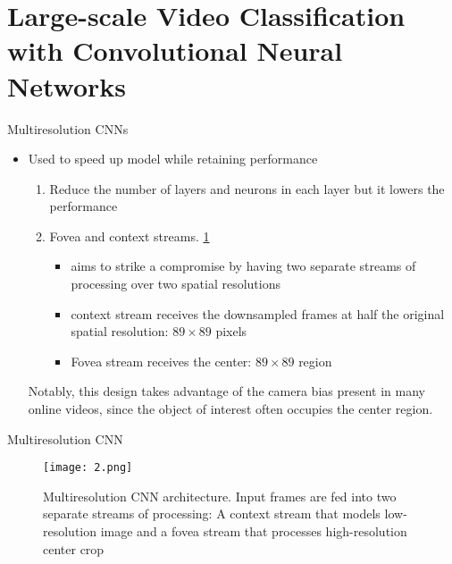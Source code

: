 \documentclass[pdf]{beamer}
\begin{document}
    \section{Large-scale Video Classification with Convolutional Neural Networks
}
    \begin{frame}{Multiresolution CNNs \cite{lsvc}} 
    \begin{itemize}
        \item Used to speed up model while retaining performance 
            
        \begin{enumerate}
            \item Reduce the number of layers and neurons in each layer but it lowers the performance
            \item Fovea and context streams. \ref{fig:multiresolution_cnn}
            \begin{itemize}
                \item aims to strike a compromise by having two
separate streams of processing over two spatial resolutions
                \item context stream receives the downsampled frames at half the original spatial resolution: $89 \times 89$ pixels
                
                \item Fovea stream receives the center: $89 \times 89 $ region
            \end{itemize}
        \end{enumerate}
        Notably, this design takes
advantage of the camera bias present in many online videos,
since the object of interest often occupies the center region.
    \end{itemize}
    \end{frame}
    
    
       \begin{frame}{Multiresolution CNN}
        \begin{figure}
            \centering
            \label{fig:multiresolution_cnn}
            \texttt{[image: 2.png]}
            \caption{ Multiresolution CNN architecture. Input frames
are fed into two separate streams of processing: A context stream that models low-resolution image and a fovea stream that processes high-resolution center crop}
            
        \end{figure}
    \end{frame}
    
\end{document}
